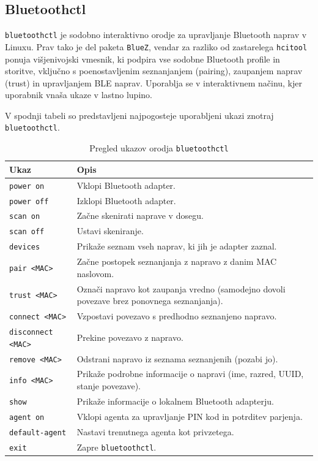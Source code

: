 \documentclass[11pt,a4paper,slovene]{article}
\begin{document}
\subsection{Bluetoothctl}

\texttt{bluetoothctl} je sodobno interaktivno orodje za upravljanje Bluetooth naprav v Linuxu. Prav tako je del paketa \texttt{BlueZ}, vendar za razliko od zastarelega \texttt{hcitool} ponuja višjenivojski vmesnik, ki podpira vse sodobne Bluetooth profile in storitve, vključno s poenostavljenim seznanjanjem (pairing), zaupanjem naprav (trust) in upravljanjem BLE naprav. Uporablja se v interaktivnem načinu, kjer uporabnik vnaša ukaze v lastno lupino.

V spodnji tabeli so predstavljeni najpogosteje uporabljeni ukazi znotraj \texttt{bluetoothctl}.

\begin{table}[h]
	\centering
	\small
	\renewcommand{\arraystretch}{1.2}
	\begin{tabularx}{\linewidth}{|l|X|}
		\hline
		\textbf{Ukaz} & \textbf{Opis} \\
		\hline
		\texttt{power on} & Vklopi Bluetooth adapter. \\
		\hline
		\texttt{power off} & Izklopi Bluetooth adapter. \\
		\hline
		\texttt{scan on} & Začne skenirati naprave v dosegu. \\
		\hline
		\texttt{scan off} & Ustavi skeniranje. \\
		\hline
		\texttt{devices} & Prikaže seznam vseh naprav, ki jih je adapter zaznal. \\
		\hline
		\texttt{pair <MAC>} & Začne postopek seznanjanja z napravo z danim MAC naslovom. \\
		\hline
		\texttt{trust <MAC>} & Označi napravo kot zaupanja vredno (samodejno dovoli povezave brez ponovnega seznanjanja). \\
		\hline
		\texttt{connect <MAC>} & Vzpostavi povezavo s predhodno seznanjeno napravo. \\
		\hline
		\texttt{disconnect <MAC>} & Prekine povezavo z napravo. \\
		\hline
		\texttt{remove <MAC>} & Odstrani napravo iz seznama seznanjenih (pozabi jo). \\
		\hline
		\texttt{info <MAC>} & Prikaže podrobne informacije o napravi (ime, razred, UUID, stanje povezave). \\
		\hline
		\texttt{show} & Prikaže informacije o lokalnem Bluetooth adapterju. \\
		\hline
		\texttt{agent on} & Vklopi agenta za upravljanje PIN kod in potrditev parjenja. \\
		\hline
		\texttt{default-agent} & Nastavi trenutnega agenta kot privzetega. \\
		\hline
		\texttt{exit} & Zapre \texttt{bluetoothctl}. \\
		\hline
	\end{tabularx}
	\caption{Pregled ukazov orodja \texttt{bluetoothctl}}
	\label{tab:bluetoothctl}
\end{table}
\end{document}
